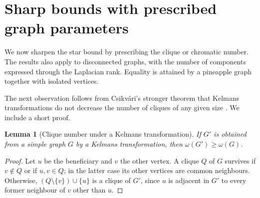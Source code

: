 \documentclass[11pt,a4paper,reqno]{amsart}
\newtheorem{lemma}[theorem]{Lemma}
\theoremstyle{remark}
\numberwithin{equation}{section}
\begin{document}
\section{Sharp bounds with prescribed graph parameters}
\label{sec:prescribed-parameters}

We now sharpen the star bound by prescribing the clique or chromatic
number. The results also apply to disconnected graphs, with the number
of components expressed through the Laplacian rank. Equality is attained
by a pineapple graph together with isolated vertices.

The next observation follows from Csikv\'ari's stronger theorem that
Kelmans transformations do not decrease the number of cliques of any
given size \cite[Theorem 5.10]{Csikvari2011}. We include a short proof.

\begin{lemma}[Clique number under a Kelmans transformation]
\label{lem:kelmans-clique}
If $G'$ is obtained from a simple graph $G$ by a Kelmans transformation,
then $\omega(G')\ge\omega(G)$.
\end{lemma}
\begin{proof}
Let $u$ be the beneficiary and $v$ the other vertex. A clique $Q$ of
$G$ survives if $v\notin Q$ or if $u,v\in Q$; in the latter case its
other vertices are common neighbours. Otherwise,
$(Q\setminus\{v\})\cup\{u\}$ is a clique of $G'$, since $u$ is
adjacent in $G'$ to every former neighbour of $v$ other than $u$.
\end{proof}
\end{document}
